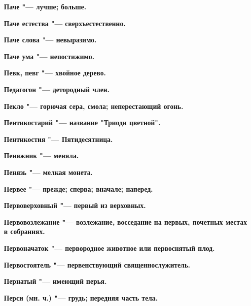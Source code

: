 \bfseries Паче \normalfont{} "--- лучше; больше. 




\bfseries Паче естества \normalfont{} "--- сверхъестественно. 




\bfseries Паче слова \normalfont{} "--- невыразимо. 




\bfseries Паче ума \normalfont{} "--- непостижимо. 




\bfseries Певк, певг \normalfont{} "--- хвойное дерево. 




\bfseries Педагогон \normalfont{} "--- детородный член. 




\bfseries Пекло \normalfont{} "--- горючая сера, смола; неперестающий огонь. 




\bfseries Пентикостарий \normalfont{} "--- название "Триоди цветной". 




\bfseries Пентикостия \normalfont{} "--- Пятидесятница. 




\bfseries Пеняжник \normalfont{} "--- меняла. 




\bfseries Пенязь \normalfont{} "--- мелкая монета. 




\bfseries Первее \normalfont{} "--- прежде; сперва; вначале; наперед. 




\bfseries Первоверховный \normalfont{} "--- первый из верховных. 




\bfseries Первовозлежание \normalfont{} "--- возлежание, восседание на первых, почетных местах в собраниях. 




\bfseries Первоначаток \normalfont{} "--- первородное животное или первоснятый плод. 




\bfseries Первостоятель \normalfont{} "--- первенствующий священнослужитель. 




\bfseries Пернатый \normalfont{} "--- имеющий перья. 




\bfseries Перси \normalfont{} (мн. ч.) "--- грудь; передняя часть тела. 




